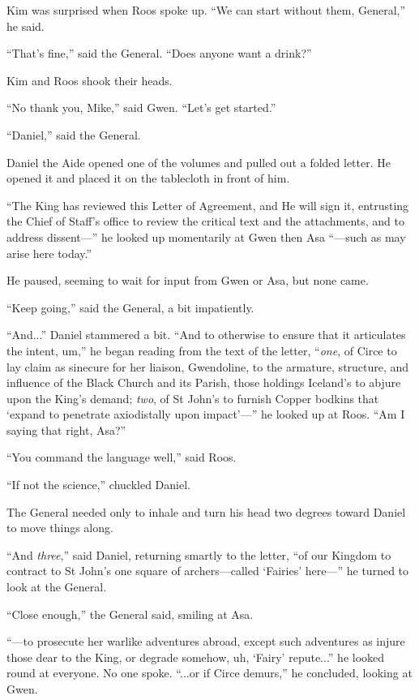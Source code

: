 \documentclass[11pt,a5paper]{article}
\begin{document}
Kim was surprised when Roos spoke up. ``We can start without them, General,'' he said.

``That's fine,'' said the General. ``Does anyone want a drink?''

Kim and Roos shook their heads.

``No thank you, Mike,'' said Gwen. ``Let's get started.''

``Daniel,'' said the General.

Daniel the Aide opened one of the volumes and pulled out a folded letter. He opened it and placed it on the tablecloth in front of him.

``The King has reviewed this Letter of Agreement, and He will sign it, entrusting the Chief of Staff's office to review the critical text and the attachments, and to address dissent---'' he looked up momentarily at Gwen then Asa ``---such as may arise here today.''

He paused, seeming to wait for input from Gwen or Asa, but none came.

``Keep going,'' said the General, a bit impatiently.

``And...'' Daniel stammered a bit. ``And to otherwise to ensure that it articulates the intent, um,'' he began reading from the text of the letter, ``\emph{one}, of Circe to lay claim as sinecure for her liaison, Gwendoline, to the armature, structure, and influence of the Black Church and its Parish, those holdings Iceland's to abjure upon the King's demand; \emph{two}, of St John's to furnish Copper bodkins that `expand to penetrate axiodistally upon impact'---'' he looked up at Roos. ``Am I saying that right, Asa?''

``You command the language well,'' said Roos.

``If not the science,'' chuckled Daniel.

The General needed only to inhale and turn his head two degrees toward Daniel to move things along.

``And \emph{three},'' said Daniel, returning smartly to the letter, ``of our Kingdom to contract to St John's one square of archers---called `Fairies' here---'' he turned to look at the General.

``Close enough,'' the General said, smiling at Asa.

``---to prosecute her warlike adventures abroad, except such adventures as injure those dear to the King, or degrade somehow, uh, `Fairy' repute...'' he looked round at everyone. No one spoke.  ``...or if Circe demurs,'' he concluded, looking at Gwen.
\end{document}
